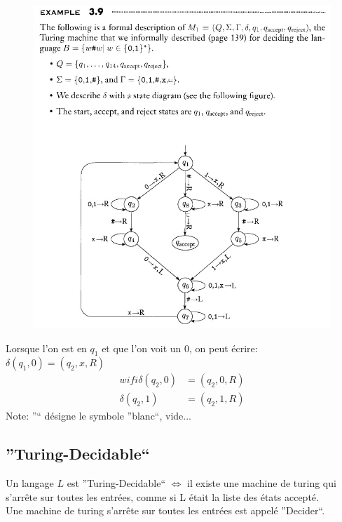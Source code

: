 \documentclass[a4paper,12pt]{article}
\begin{document}
  \begin{center}
    \begin{figure}[h]
      \includegraphics[scale=0.5]{./Cours2_Ex3_9.jpg}
    \end{figure}
  \end{center}
  
  Lorsque l'on est en $q_1$ et que l'on voit un 0, on peut écrire: $\delta(q_1, 0) = (q_2, x, R)$\\
  \begin{align*}wifi
    \delta(q_2, 0) &= (q_2, 0, R)\\
    \delta(q_2, 1) &= (q_2, 1, R)
  \end{align*}
  Note: ''\textvisiblespace`` désigne le symbole ''blanc``, vide...
  
  \subsection{''Turing-Decidable``}
    Un langage $L$ est ''Turing-Decidable`` $\Leftrightarrow$ il existe une machine de turing qui s'arrête sur toutes les entrées, comme si L était la liste des états accepté.\\
    Une machine de turing s'arrête sur toutes les entrées est appelé ''Decider``.\
    
\end{document}
